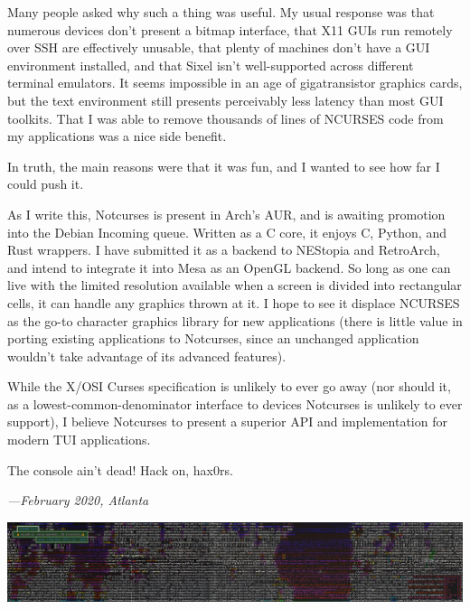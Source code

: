 \documentclass[letterpaper,10pt]{article}
\newcommand\CC{C\nolinebreak\hspace{-.05em}\raisebox{.4ex}{\relsize{-3}{\textbf{+}}}\nolinebreak\hspace{-.10em}\raisebox{.4ex}{\relsize{-3}{\textbf{+}}}\hspace{.2em}}
\begin{document}
Many people asked why such a thing was useful. My usual response was that
numerous devices don't present a bitmap interface, that X11 GUIs run remotely
over SSH are effectively unusable, that plenty of machines don't have a GUI
environment installed, and that Sixel isn't well-supported across different
terminal emulators. It seems impossible in an age of gigatransistor graphics
cards, but the text environment still presents perceivably less latency
than most GUI toolkits. That I was able to remove thousands of lines
of NCURSES code from my applications was a nice side benefit.

In truth, the main reasons were that it was fun, and I wanted to see how far
I could push it.

As I write this, Notcurses is present in Arch's AUR, and is awaiting promotion
into the Debian Incoming queue. Written as a C core, it enjoys \CC, Python, and
Rust wrappers. I have submitted it as a backend to NEStopia and RetroArch, and
intend to integrate it into Mesa as an OpenGL backend. So long as one can live
with the limited resolution available when a screen is divided into rectangular
cells, it can handle any graphics thrown at it. I hope to see it displace
NCURSES as the go-to character graphics library for new applications (there is
little value in porting existing applications to Notcurses, since an unchanged
application wouldn't take advantage of its advanced features).

While the X/OSI Curses specification is unlikely to ever go away (nor should
it, as a lowest-common-denominator interface to devices Notcurses is unlikely
to ever support), I believe Notcurses to present a superior API and
implementation for modern TUI applications.

The console ain't dead! Hack on, hax0rs.

\vspace{.5in}

\begin{flushright}
  \textit{---February 2020, Atlanta}
\end{flushright}

\vspace{1in}

\begin{center}
\includegraphics[width=1\linewidth]{media/widechars.png}
\end{center}
\end{document}
